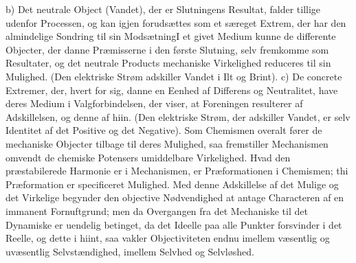 \documentclass[12pt]{book}
\begin{document}
b) Det neutrale Object (Vandet), der er Slutningens Resultat, falder tillige udenfor
Processen, og kan igjen forudsættes som et særeget Extrem, der har den almindelige Sondring
til sin Modsætning\quad I et givet Medium kunne de differente Objecter, der danne
Præmisserne i den første Slutning, selv fremkomme som Resultater, og det neutrale Products
mechaniske Virkelighed reduceres til sin Mulighed. (Den elektriske Strøm adskiller Vandet i
Ilt og Brint). c) De concrete Extremer, der, hvert for sig, danne en Eenhed af Differens og
Neutralitet, have deres Medium i Valgforbindelsen, der viser, at Foreningen resulterer af
Adskillelsen, og denne af hiin. (Den elektriske Strøm, der adskiller Vandet, er selv
Identitet af det Positive og det Negative). Som Chemismen overalt fører de mechaniske
Objecter tilbage til deres Mulighed, saa fremstiller Mechanismen omvendt de chemiske
Potensers umiddelbare Virkelighed. Hvad den præstabilerede Harmonie er i Mechanismen, er
Præformationen i Chemismen; thi Præformation er specificeret Mulighed. Med denne Adskillelse
af det Mulige og det Virkelige begynder den objective Nødvendighed at antage Characteren af
en immanent Fornuftgrund; men da Overgangen fra det Mechaniske til det Dynamiske er uendelig
betinget, da det Ideelle paa alle Punkter forsvinder i det Reelle, og dette i hiint, saa
vakler Objectiviteten endnu imellem væsentlig og uvæsentlig Selvstændighed, imellem Selvhed
og Selvløshed.
\end{document}
